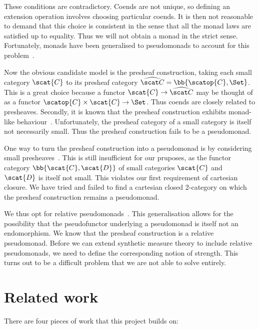 These conditions are contradictory. Coends are not unique, so defining an
extension operation involves choosing particular coends. It is then not
reasonable to demand that this choice is consistent in the sense that all the
monad laws are satisfied up to equality. Thus we will not obtain a monad in the
strict sense. Fortunately, monads have been generalised to pseudomonads to
account for this problem~\cite{marmolejo2013}.

Now the obvious candidate model is the presheaf construction, taking each small
category $\scat{C}$ to its presheaf category $\widehat{\scat C} =
\bb{\scatop{C}, \Set}$. This is a great choice because a functor
$\scat{C}\to\widehat{\scat C}$ may be thought of as a functor
$\scatop{C}\times\scat{C}\to\Set$. Thus coends are closely related to
presheaves. Secondly, it is known that the presheaf construction exhibits
monad-like behaviour~\cite{fiore2017}. Unfortunately, the presheaf category of
a small category is itself not necessarily small. Thus the presheaf
construction fails to be a pseudomonad.

One way to turn the presheaf construction into a pseudomonad is by considering
small presheaves~\cite{day2007}. This is still insufficient for our pruposes,
as the functor category $\bb{\scat{C},\scat{D}}$ of small categories $\scat{C}$
and $\scat{D}$ is itself not small. This violates our first requirement of
cartesian closure. We have tried and failed to find a cartesian closed
2-category on which the presheaf construction remains a pseudomonad.

We thus opt for relative pseudomonads~\cite{fiore2017}. This generalisation
allows for the possibility that the pseudofunctor underlying a pseudomonad is
itself not an endomorphism. We know that the presheaf construction is a
relative pseudomonad. Before we can extend synthetic measure theory to include
relative pseudomonads, we need to define the corresponding notion of strength.
This turns out to be a difficult problem that we are not able to solve
entirely.

\section{Related work}

There are four pieces of work that this project builds on:

